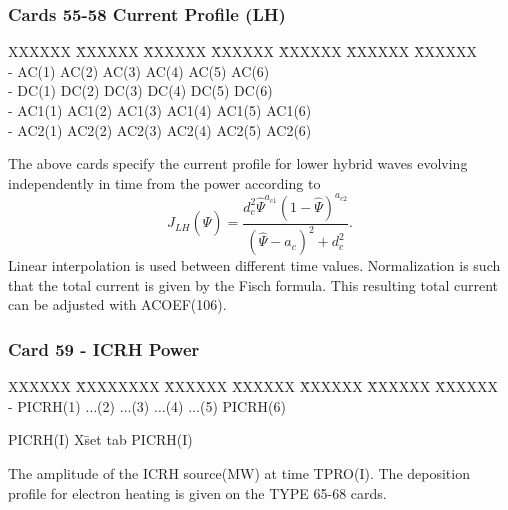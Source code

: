 \newpage \subsubsection{Cards 55-58 Current Profile (LH)}
\begin{tabbing}
XXXXXX \= XXXXXX \= XXXXXX \= XXXXXX \= XXXXXX \= XXXXXX \=XXXXXX
      \\
- \> \footnotesize AC(1) \>\footnotesize AC(2) \>\footnotesize AC(3) \>\footnotesize AC(4)
\>\footnotesize AC(5) \>\footnotesize AC(6)\\
- \> \footnotesize DC(1) \>\footnotesize DC(2) \>\footnotesize DC(3) \>\footnotesize DC(4)
\>\footnotesize DC(5) \>\footnotesize DC(6)\\
- \> \footnotesize AC1(1) \>\footnotesize AC1(2) \>\footnotesize AC1(3) \>\footnotesize AC1(4)
\>\footnotesize AC1(5) \>\footnotesize AC1(6)\\
- \> \footnotesize AC2(1) \>\footnotesize AC2(2) \>\footnotesize AC2(3) \>\footnotesize AC2(4)
\>\footnotesize AC2(5) \>\footnotesize AC2(6)\\
\end{tabbing}
The above cards specify the current profile for lower hybrid waves evolving independently in
time from the power according to
\begin{equation}
J_{LH}(\hat{\Psi}) = \frac{d^2_c \hat{\Psi}^{a_{c1}}(1-\hat{\Psi})^{a_{c2}}}{(\hat{\Psi}-a_c)^2+d_c^2} .
\end{equation}
Linear interpolation is used between different time values. Normalization is such that the total current is given by the Fisch formula.
This resulting total current can be adjusted with ACOEF(106).
\newpage \subsubsection{Card 59 - ICRH Power}
\begin{tabbing}
XXXXXX \= XXXXXXXX \= XXXXXX \= XXXXXX \= XXXXXX \= XXXXXX \=
XXXXXX       \\
\footnotesize - \>\footnotesize  PICRH(1) \>\footnotesize $\ldots$(2) \>\footnotesize
$\ldots$(3) \>\footnotesize $\ldots$(4) \>\footnotesize $\ldots$(5) \>\footnotesize PICRH(6)
\\
\end{tabbing}
\begin{tabbing}
PICRH(I) X\= set tab \kill
PICRH(I) \> \parbox[t]{\width}{The amplitude of the ICRH source(MW) at time TPRO(I).  The
deposition profile for electron heating is given on the TYPE 65-68 cards.}
\end{tabbing}
